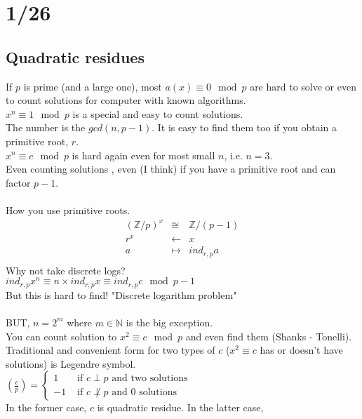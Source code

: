 \section*{1/26}
  \subsection*{Quadratic residues}
    If $p$ is prime (and a large one), most $a(x) \equiv 0 \mod p$ are
    hard to solve or even to count solutions for computer with known 
    algorithms.\\
    $x^n \equiv 1 \mod p$ is a special and easy to count solutions.\\
    The number is the $gcd(n, p-1)$. It is easy to find them too if you 
    obtain a primitive root, $r$.\\
    $x^n \equiv c \mod p$ is hard again even for most small $n$, i.e. $n=3$.\\
    Even counting solutions , even (I think) if you have a primitive root
    and can factor $p-1$.\\\\
    How you use primitive roots.
    \begin{eqnarray*}
      (\mathbb{Z}/p)^x &\cong& \mathbb{Z}/(p-1)\\
      r^x &\leftarrow& x\\
      a &\mapsto& ind_{r,p}a\\
    \end{eqnarray*}
    Why not take discrete logs?\\
    $ind_{r,p}x^n \equiv n \times ind_{r,p}x \equiv ind_{r,p}c \mod p-1$\\
    But this is hard to find! "Discrete logarithm problem"\\\\
    BUT, $n=2^m$ where $m \in \mathbb{N}$ is the big exception.\\
    You can count solution to $x^2 \equiv c \mod p$ and even find them
    (Shanks - Tonelli).\\
    Traditional and convenient form for two types of $c$ ($x^2 \equiv c$ has
    or doesn't have solutions) is Legendre symbol.\\
    $(\frac{c}{p}) = \begin{cases} 1 & \text{ if $c \perp p$ and two solutions}
    \\ -1 & \text{ if $c \not\perp p$ and 0 solutions}\end{cases}$\\
    In the former case, $c$ is quadratic residue. In the latter case,
